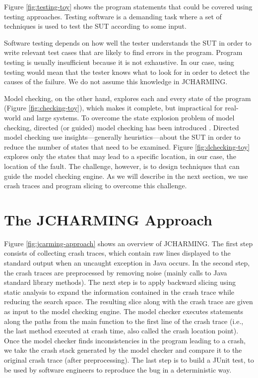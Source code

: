 \documentclass[times]{smrauth}
\begin{document}
Figure \ref{fig:testing-toy} shows the program statements that could be covered using testing approaches. Testing software is a demanding task where a set of techniques is used to test the SUT according to some input.

Software testing depends on how well the tester understands the SUT in order to write relevant test cases that are likely to find errors in the program. Program testing is usually insufficient because it is not exhaustive. In our case, using testing would mean that the tester knows what to look for in order to detect the causes of the failure. We do not assume this knowledge in JCHARMING. 

Model checking, on the other hand, explores each and every state of the program (Figure \ref{fig:checking-toy}), which makes it complete, but impractical for real-world and large systems. To overcome the state explosion problem of model checking, directed (or guided) model checking has been introduced \cite{Rungta2009}. Directed model checking use insights—generally heuristics—about the SUT in order to reduce the number of states that need to be examined. Figure \ref{fig:dchecking-toy} explores only the states that may lead to a specific location, in our case, the location of the fault. The challenge, however, is to design techniques that can guide the model checking engine. As we will describe in the next section, we use crash traces and program slicing to overcome this challenge.

\section{The JCHARMING Approach\label{sec:jcharming}}

Figure \ref{fig:jcarming-approach} shows an overview of JCHARMING. The first step
consists of collecting crash traces, which contain raw lines
displayed to the standard output when an uncaught exception
in Java occurs. In the second step, the crash traces are
preprocessed by removing noise (mainly calls to Java standard
library methods). The next step is to apply backward slicing
using static analysis to expand the information contained in
the crash trace while reducing the search space. The resulting
slice along with the crash trace are given as input to the model
checking engine. The model checker executes statements
along the paths from the main function to the first line of the
crash trace (i.e., the last method executed at crash time, also
called the crash location point). Once the model checker finds
inconsistencies in the program leading to a crash, we take the
crash stack generated by the model checker and compare it to
the original crash trace (after preprocessing). The last step is
to build a JUnit test, to be used by software engineers to
reproduce the bug in a deterministic way.
\end{document}

